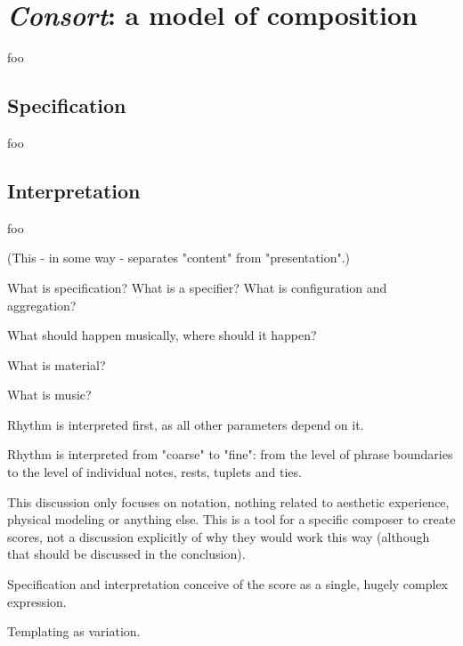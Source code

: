 \chapter{\emph{Consort}: a model of composition}

foo

\section{Specification}

foo

\section{Interpretation}

foo

(This - in some way - separates "content" from "presentation".)

What is specification? What is a specifier? What is configuration and
aggregation?

What should happen musically, where should it happen?

What is material?

What is music?

Rhythm is interpreted first, as all other parameters depend on it.

Rhythm is interpreted from "coarse" to "fine": from the level of phrase
boundaries to the level of individual notes, rests, tuplets and ties.

This discussion only focuses on notation, nothing related to aesthetic
experience, physical modeling or anything else. This is a tool for a specific
composer to create scores, not a discussion explicitly of why they would work
this way (although that should be discussed in the conclusion).

Specification and interpretation conceive of the score as a single, hugely
complex expression.

Templating as variation.